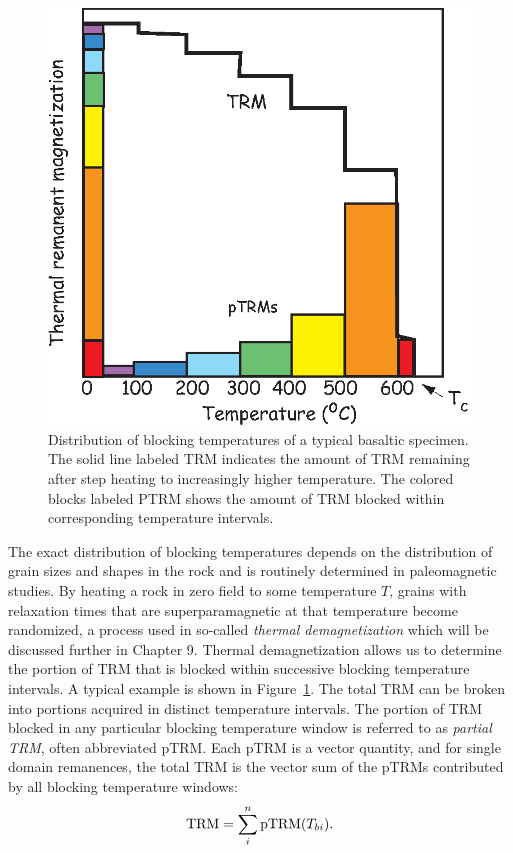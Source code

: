 \begin{figure}[htb]
\centering  \includegraphics[width=9 cm]{EPSfiles/pTRM.eps}
\caption{Distribution of blocking temperatures
 of a typical basaltic specimen.
The solid line labeled TRM indicates
the amount of TRM remaining after
step heating to increasingly higher
temperature.   The colored blocks
 labeled PTRM
shows the amount of TRM blocked within
corresponding temperature intervals.  }
\label{fig:ptrm}
\end{figure}

The exact distribution of  blocking temperatures depends on the distribution of grain sizes and shapes in the rock and is
routinely determined in paleomagnetic studies.  By heating a rock in zero field to some temperature $T$,  grains with relaxation times that are superparamagnetic at that temperature become randomized, a process used in so-called 
{\it thermal demagnetization} which will be discussed further in Chapter 9.   Thermal demagnetization allows us to determine the portion of TRM that is blocked within successive blocking temperature intervals. A
typical example is shown in Figure~\ref{fig:ptrm}.   
The total TRM can be broken into portions acquired in distinct temperature intervals.   The portion of TRM
blocked in any particular blocking temperature window is referred to as
{\it partial TRM},  often abbreviated pTRM. Each pTRM is a
vector quantity, and for single domain remanences,  the total TRM is the vector sum of the pTRMs contributed by all blocking temperature windows:
$$
\hbox{TRM}  = \sum_i^n \hbox{pTRM} (T_{bi}).
$$

